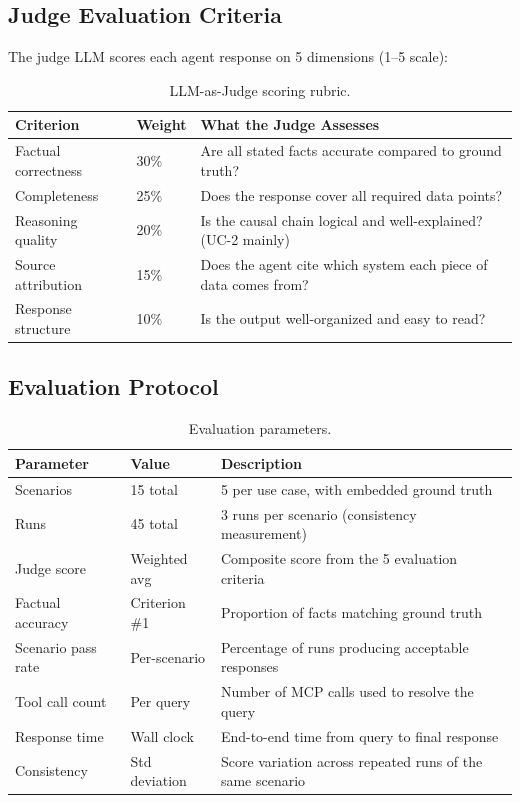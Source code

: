 \documentclass[12pt,a4paper]{report}
\begin{document}
\subsection{Judge Evaluation Criteria}

The judge LLM scores each agent response on 5 dimensions (1--5 scale):

\begin{table}[H]
\centering\small
\caption{LLM-as-Judge scoring rubric.}
\begin{tabularx}{\textwidth}{@{} l l X @{}}
\toprule
\textbf{Criterion} & \textbf{Weight} & \textbf{What the Judge Assesses} \\
\midrule
Factual correctness  & 30\% & Are all stated facts accurate compared to ground truth? \\
Completeness         & 25\% & Does the response cover all required data points? \\
Reasoning quality    & 20\% & Is the causal chain logical and well-explained? (UC-2 mainly) \\
Source attribution    & 15\% & Does the agent cite which system each piece of data comes from? \\
Response structure   & 10\% & Is the output well-organized and easy to read? \\
\bottomrule
\end{tabularx}
\end{table}

\subsection{Evaluation Protocol}

\begin{table}[H]
\centering\small
\caption{Evaluation parameters.}
\begin{tabularx}{\textwidth}{@{} l l X @{}}
\toprule
\textbf{Parameter} & \textbf{Value} & \textbf{Description} \\
\midrule
Scenarios         & 15 total      & 5 per use case, with embedded ground truth \\
Runs              & 45 total      & 3 runs per scenario (consistency measurement) \\
Judge score       & Weighted avg  & Composite score from the 5 evaluation criteria \\
Factual accuracy  & Criterion \#1 & Proportion of facts matching ground truth \\
Scenario pass rate & Per-scenario  & Percentage of runs producing acceptable responses \\
Tool call count   & Per query     & Number of MCP calls used to resolve the query \\
Response time     & Wall clock    & End-to-end time from query to final response \\
Consistency       & Std deviation & Score variation across repeated runs of the same scenario \\
\bottomrule
\end{tabularx}
\end{table}
\end{document}
